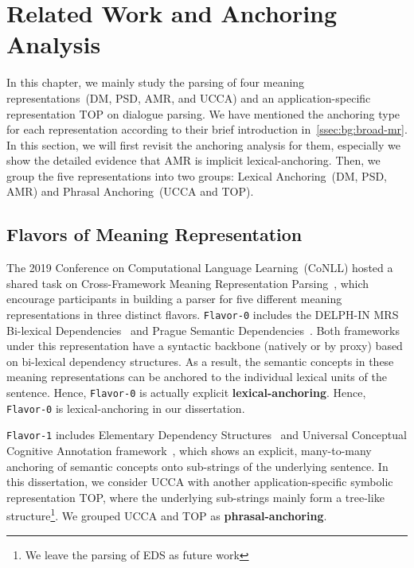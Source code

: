 \section[Related Work and Anchoring Analysis]{Related Work and
  Anchoring Analysis}
\label{sec:lex-phr:factorization-analysis}

In this chapter, we mainly study the parsing of four meaning
representations~(DM, PSD, AMR, and UCCA) and an application-specific
representation TOP on dialogue parsing. We have mentioned the
anchoring type for each representation according to their brief
introduction in~\autoref{ssec:bg:broad-mr}. In this section, we will
first revisit the anchoring analysis for them, especially we show the
detailed evidence that AMR is implicit lexical-anchoring. Then, we
group the five representations into two groups: Lexical Anchoring~(DM,
PSD, AMR) and Phrasal Anchoring~(UCCA and TOP).

\subsection{Flavors of Meaning Representation}
\label{ssec:lex-phr:flavors}

The 2019 Conference on Computational Language Learning~(CoNLL) hosted
a shared task on Cross-Framework Meaning Representation
Parsing~\cite[MRP 2019,][]{Oep:Abe:Haj:19}, which encourage
participants in building a parser for five different meaning
representations in three distinct flavors. \texttt{Flavor-0} includes
the DELPH-IN MRS Bi-lexical Dependencies~\cite[DM,][]{ivanova2012did}
and Prague Semantic
Dependencies~\cite[PSD,][]{hajic2012announcing,miyao2014house}. Both
frameworks under this representation have a syntactic backbone
(natively or by proxy) based on bi-lexical dependency
structures. As a result, the semantic concepts in these meaning
representations can be anchored to the individual lexical units of the
sentence. Hence, \texttt{Flavor-0} is actually explicit
\textbf{lexical-anchoring}. Hence, \texttt{Flavor-0} is
lexical-anchoring in our dissertation.

\texttt{Flavor-1} includes Elementary Dependency
Structures~\cite[EDS,][]{oepen2006discriminant} and Universal
Conceptual Cognitive Annotation
framework~\cite[UCCA,][]{abend2013universal}, which shows an explicit,
many-to-many anchoring of semantic concepts onto sub-strings of the
underlying sentence. In this dissertation, we consider UCCA with another
application-specific symbolic representation TOP, where the underlying
sub-strings mainly form a tree-like structure\footnote{We leave the
  parsing of EDS as future work}. We grouped UCCA and TOP as
\textbf{phrasal-anchoring}.

